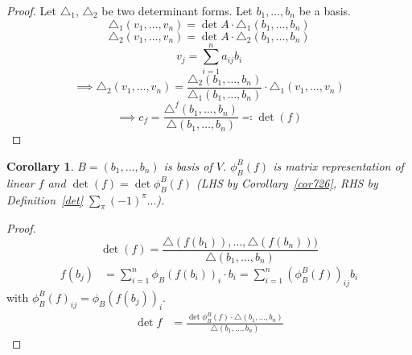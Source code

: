 \documentclass[a4paper]{article}
\newcounter{lecref}[section]
\numberwithin{lecref}{section}
\newtheorem{corollary}[lecref]{Corollary}
\begin{document}
\begin{proof}
  Let $\triangle_1$, $\triangle_2$ be two determinant forms. Let $b_1, \dots, b_n$ be a basis.
  \[ \triangle_1 (v_1, \dots, v_n) = \det{A} \cdot \triangle_1(b_1, \dots, b_n) \]
  \[ \triangle_2 (v_1, \dots, v_n) = \det{A} \cdot \triangle_2(b_1, \dots, b_n) \]
  \[ v_j = \sum_{i=1}^n a_{ij} b_i \]
  \[ \implies \triangle_2(v_1, \dots, v_n) = \frac{\triangle_2(b_1, \dots, b_n)}{\triangle_1(b_1, \dots, b_n)} \cdot \triangle_1(v_1, \dots, v_n) \]
  \[ \implies c_f = \frac{\triangle^f(b_1, \dots, b_n)}{\triangle (b_1, \dots, b_n)} \eqqcolon \det(f) \]
\end{proof}

\begin{corollary} %
  \label{cor:feqphif}
  $B = (b_1, \dots, b_n)$ is basis of $V$.
  $\phi_B^B(f)$ is matrix representation of linear $f$ and $\det(f) = \det\phi_B^B(f)$
  (LHS by Corollary~\ref{cor726}, RHS by Definition~\ref{det} $\sum_{\pi} (-1)^\pi \dots$).
\end{corollary}

\begin{proof}
  \[ \det(f) = \frac{\triangle(f(b_1)), \dots, \triangle(f(b_n)))}{\triangle (b_1, \dots, b_n)} \]
  \begin{align*}
    f(b_j) &= \sum_{i=1}^n \phi_B(f(b_i))_i \cdot b_i = \sum_{i=1}^n \left(\phi_B^B(f)\right)_{ij} b_i
  \end{align*}
  with $\phi_B^B(f)_{ij} = \phi_B(f(b_j))_i$.
  \begin{align*}
    \det{f} &= \frac{\det{\phi_B^B(f) \cdot \triangle(b_1, \dots, b_n)}}{\triangle(b_1, \dots, b_n)}
  \end{align*}
\end{proof}
\end{document}
